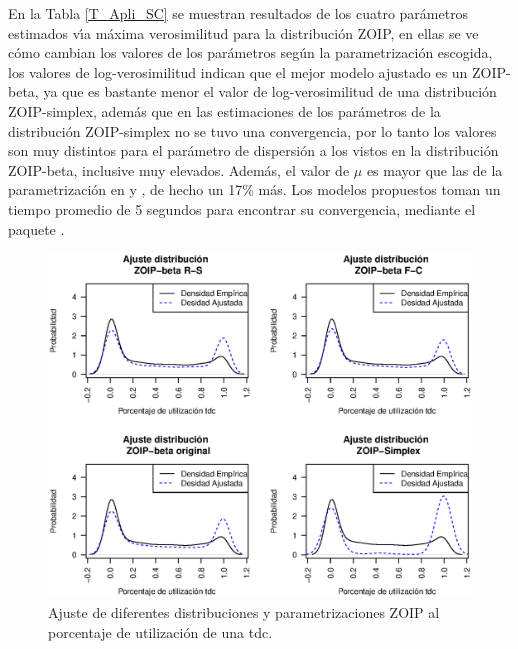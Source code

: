 En la Tabla \ref{T_Apli_SC} se muestran resultados de los cuatro par\'{a}metros estimados v\'{\i}a m\'{a}xima verosimilitud para la distribuci\'{o}n ZOIP, en ellas se ve c\'{o}mo cambian los valores de los par\'{a}metros seg\'{u}n la parametrizaci\'{o}n escogida, los valores de log-verosimilitud indican que el mejor modelo ajustado es un ZOIP-beta, ya que es bastante menor el valor de log-verosimilitud de una distribuci\'{o}n ZOIP-simplex, adem\'{a}s que en las estimaciones de los par\'{a}metros de la distribuci\'{o}n ZOIP-simplex no se tuvo una convergencia, por lo tanto los valores son muy distintos para el par\'{a}metro de dispersi\'{o}n a los vistos en la distribuci\'{o}n ZOIP-beta, inclusive muy elevados. Adem\'{a}s, el valor de $\mu$ es mayor que las de la parametrizaci\'{o}n en \cite{Stasinopoulos2} y \cite{Ferrari2}, de hecho un 17\% m\'{a}s. Los modelos propuestos toman un tiempo promedio de 5 segundos para encontrar su convergencia, mediante el paquete .\\

\begin{figure}
	\begin{center}
		\includegraphics[scale=0.55]{Aplicacion_SC.eps}
		\caption{Ajuste de diferentes distribuciones y parametrizaciones ZOIP al porcentaje de utilizaci\'{o}n de una tdc.}
		\label{Apli_Aju_ZOIP}
	\end{center}
\end{figure}


